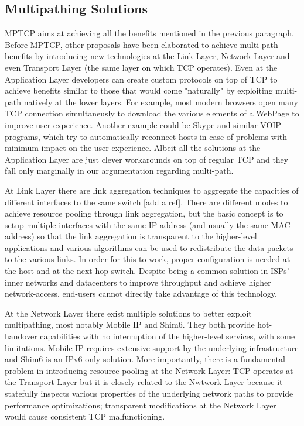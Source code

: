 \subsection{Multipathing Solutions}
\vspace{5mm}
MPTCP aims at achieving all the benefits mentioned in the previous paragraph. Before MPTCP, other proposals have been elaborated to achieve multi-path benefits by introducing new technologies at the Link Layer, Network Layer and even Transport Layer (the same layer on which TCP operates). Even at the Application Layer developers can create custom protocols on top of TCP to achieve benefits similar to those that would come "naturally" by exploiting multi-path natively at the lower layers. For example, most modern browsers open many TCP connection simultaneusly to download the various elements of a WebPage to improve user experience. Another example could be Skype and similar VOIP programs, which try to automatically reconnect hosts in case of problems with minimum impact on the user experience. Albeit all the solutions at the Application Layer are just clever workarounds on top of regular TCP and they fall only marginally in our argumentation regarding multi-path.


At Link Layer there are link aggregation techniques to aggregate the capacities of different interfaces to the same switch [add a ref]. There are different modes to achieve resource pooling through link aggregation, but the basic concept is to setup multiple interfaces with the same IP address (and usually the same MAC address) so that the link aggregation is transparent to the higher-level applications and various algorithms can be used to redistribute the data packets to the various links. In order for this to work, proper configuration is needed at the host and at the next-hop switch. Despite being a common solution in ISPs' inner networks and datacenters to improve throughput and achieve higher network-access, end-users cannot directly take advantage of this technology.


At the Network Layer there exist multiple solutions to better exploit multipathing, most notably Mobile IP and Shim6. They both provide hot-handover capabilities with no interruption of the higher-level services, with some limitations. Mobile IP requires extensive support by the underlying infrastructure and Shim6 is an IPv6 only solution. More importantly, there is a fundamental problem in introducing resource pooling at the Network Layer: TCP operates at the Transport Layer but it is closely related to the Nwtwork Layer because it statefully inspects various properties of the underlying network paths to provide performance optimizations; transparent modifications at the Network Layer would cause consistent TCP malfunctioning.


